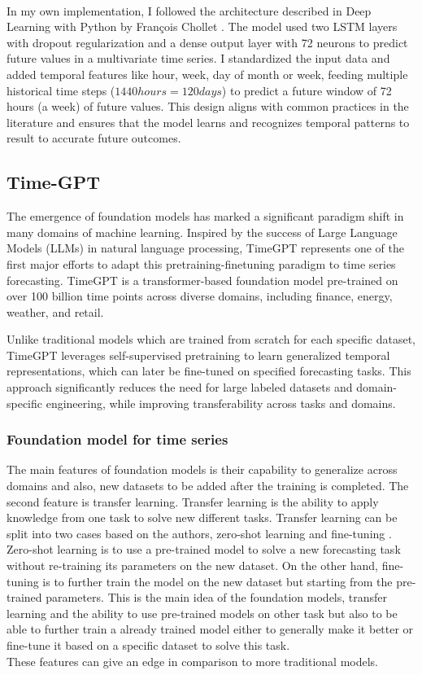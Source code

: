\documentclass{article}
\begin{document}
\\
In my own implementation, I followed the architecture described in Deep Learning with Python by François Chollet \cite{Francois}. The model used two LSTM layers with dropout regularization and a dense output layer with 72 neurons to predict future values in a multivariate time series. I standardized the input data and added temporal features like hour, week, day of month or week, feeding multiple historical time steps ($1440 hours = 120days$) to predict a future window of 72 hours (a week) of future values. This design aligns with common practices in the literature and ensures that the model learns and recognizes temporal patterns to result to accurate future outcomes.

\subsection{Time-GPT}
The emergence of foundation models has marked a significant paradigm shift in many domains of machine learning. Inspired by the success of Large Language Models (LLMs) in natural language processing, TimeGPT represents one of the first major efforts to adapt this pretraining-finetuning paradigm to time series forecasting. TimeGPT is a transformer-based foundation model pre-trained on over 100 billion time points across diverse domains, including finance, energy, weather, and retail. \cite{garza2023timegpt1}

Unlike traditional models which are trained from scratch for each specific dataset, TimeGPT leverages self-supervised pretraining to learn generalized temporal representations, which can later be fine-tuned on specified forecasting tasks. This approach significantly reduces the need for large labeled datasets and domain-specific engineering, while improving transferability across tasks and domains.

\subsubsection{Foundation model for time series}
The main features of foundation models is their capability to generalize across domains and also, new datasets to be added after the training is completed. The second feature is transfer learning. Transfer learning is the ability to apply knowledge from one task to solve new different tasks. Transfer learning can be split into two cases based on the authors, zero-shot learning and fine-tuning \cite{garza2023timegpt1}. Zero-shot learning is to use a pre-trained model to solve a new forecasting task without re-training its parameters on the new dataset. On the other hand, fine-tuning is to further train the model on the new dataset but starting from the pre-trained parameters. This is the main idea of the foundation models, transfer learning and the ability to use pre-trained models on other task but also to be able to further train a already trained model either to generally make it better or fine-tune it based on a specific dataset to solve this task.\\
These features can give an edge in comparison to more traditional models.\\
\end{document}
